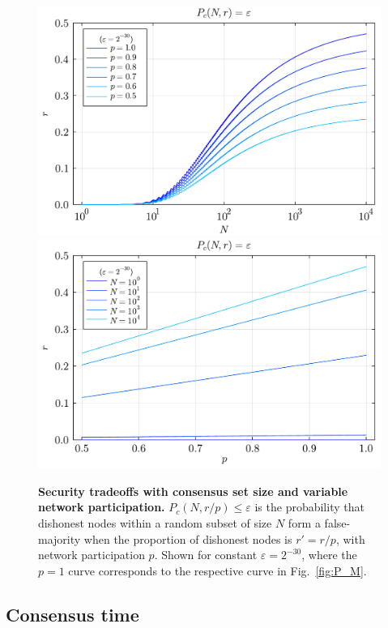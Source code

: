 \begin{figure}
	\includegraphics[width=\columnwidth]{figures/majority_prob_p.pdf}\\
	\includegraphics[width=\columnwidth]{figures/majority_prob_N.pdf}
	\caption{\textbf{Security tradeoffs with consensus set size and variable network participation.} \mbox{$P_c(N,r/p)\leq\varepsilon$} is the probability that dishonest nodes within a random subset of size $N$ form a false-majority when the proportion of dishonest nodes is \mbox{$r'=r/p$}, with network participation $p$. Shown for constant \mbox{$\varepsilon=2^{-30}$}, where the \mbox{$p=1$} curve corresponds to the respective curve in Fig.~\ref{fig:P_M}.}\label{fig:P_M_p}
\end{figure}

\subsection{Consensus time}

